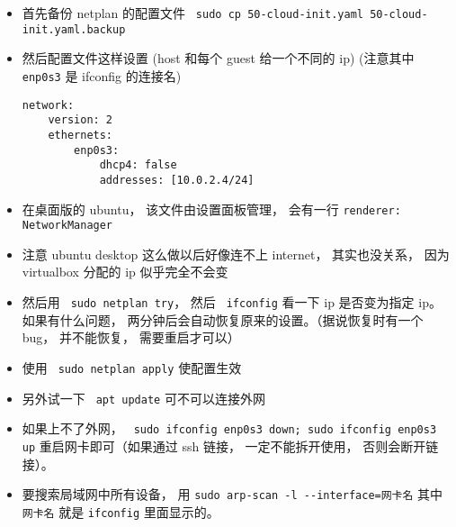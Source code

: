 \begin{itemize}
\item 首先备份 netplan 的配置文件 \verb` sudo cp 50-cloud-init.yaml 50-cloud-init.yaml.backup`
\item 然后配置文件这样设置 (host 和每个 guest 给一个不同的 ip) (注意其中 \verb` enp0s3` 是 ifconfig 的连接名)
\begin{lstlisting}[language=none]
network:
    version: 2
    ethernets:
        enp0s3:
            dhcp4: false
            addresses: [10.0.2.4/24]
\end{lstlisting}
\item 在桌面版的 ubuntu， 该文件由设置面板管理， 会有一行 \verb|renderer: NetworkManager|
\item 注意 ubuntu desktop 这么做以后好像连不上 internet， 其实也没关系， 因为 virtualbox 分配的 ip 似乎完全不会变
\item 然后用 \verb` sudo netplan try`， 然后 \verb` ifconfig` 看一下 ip 是否变为指定 ip。 如果有什么问题， 两分钟后会自动恢复原来的设置。（据说恢复时有一个 bug， 并不能恢复， 需要重启才可以）
\item 使用 \verb` sudo netplan apply` 使配置生效
\item 另外试一下 \verb` apt update` 可不可以连接外网
\item 如果上不了外网， \verb` sudo ifconfig enp0s3 down; sudo ifconfig enp0s3 up` 重启网卡即可（如果通过 ssh 链接， 一定不能拆开使用， 否则会断开链接）。
\item 要搜索局域网中所有设备， 用 \verb|sudo arp-scan -l --interface=网卡名| 其中 \verb|网卡名| 就是 \verb|ifconfig| 里面显示的。
\end{itemize}

